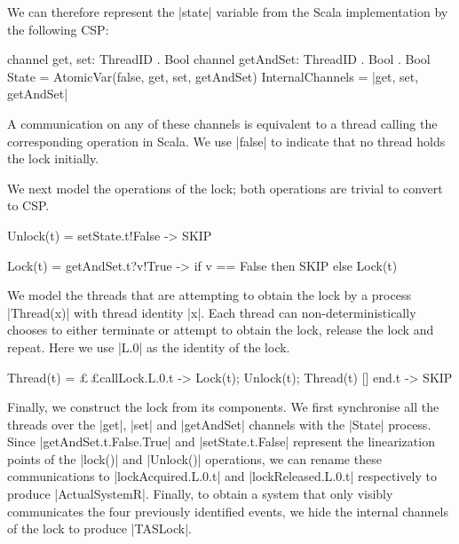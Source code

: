 We can therefore represent the |state| variable from the Scala implementation by the following CSP:
\begin{cspm}
  channel get, set: ThreadID . Bool
  channel getAndSet: ThreadID . Bool . Bool
  State = AtomicVar(false, get, set, getAndSet)
  InternalChannels = {|get, set, getAndSet|}
\end{cspm}
A communication on any of these channels is equivalent to a thread calling the corresponding operation in Scala. We use |false| to indicate that no thread holds the lock initially.

We next model the operations of the lock; both operations are trivial to convert to CSP.
\begin{cspm}
  Unlock(t) = setState.t!False -> SKIP 

  Lock(t) = getAndSet.t?v!True -> if v == False then SKIP 
                                    else Lock(t)
\end{cspm}



We model the threads that are attempting to obtain the lock by a process |Thread(x)| with thread identity |x|. Each thread can non-deterministically chooses to either terminate or attempt to obtain the lock, release the lock and repeat. %
Here we use |L.0| as the identity of the lock.

\begin{cspm}
  Thread(t) =   £$\,$£callLock.L.0.t -> Lock(t); Unlock(t); Thread(t)
              [] end.t -> SKIP
\end{cspm}

Finally, we construct the lock from its components. We first synchronise all the threads over the |get|, |set| and |getAndSet| channels with the |State| process. Since \newline|getAndSet.t.False.True| and |setState.t.False| represent the linearization points of the |lock()| and |Unlock()| operations, we can rename these communications to |lockAcquired.L.0.t| and |lockReleased.L.0.t| respectively to produce |ActualSystemR|. Finally, to obtain a system that only visibly communicates the four previously identified events, we hide the internal channels of the lock to produce |TASLock|. %

